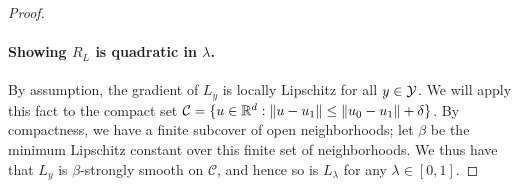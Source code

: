 \begin{proof}
  \paragraph{Showing $R_L$ is quadratic in $\lambda$.}
  By assumption, the gradient of $L_y$ is locally Lipschitz for all $y\in\mathcal{Y}$.
  We will apply this fact to the compact set $\mathcal C = \{u \in \mathbb{R}^d : \|u - u_1\| \leq \|u_0 - u_1\| + \delta\}$.
  By compactness, we have a finite subcover of open neighborhoods; let $\beta$ be the minimum Lipschitz constant over this finite set of neighborhoods.
  We thus have that $L_y$ is $\beta$-strongly smooth on $\mathcal C$, and hence so is $L_\lambda$ for any $\lambda \in [0,1]$.
  

\end{proof}
